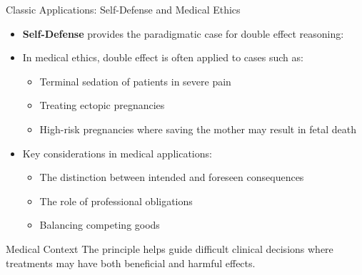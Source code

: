 \documentclass{beamer}
\begin{document}
\begin{frame}{Classic Applications: Self-Defense and Medical Ethics}
    \begin{itemize}
        \item \textbf{Self-Defense} provides the paradigmatic case for double effect reasoning:
        
        \item In medical ethics, double effect is often applied to cases such as:
        \begin{itemize}
            \item Terminal sedation of patients in severe pain
            \item Treating ectopic pregnancies
            \item High-risk pregnancies where saving the mother may result in fetal death
        \end{itemize}
        
        \item Key considerations in medical applications:
        \begin{itemize}
            \item The distinction between intended and foreseen consequences
            \item The role of professional obligations
            \item Balancing competing goods
        \end{itemize}
    \end{itemize}
    
    \begin{alertblock}{Medical Context}
        The principle helps guide difficult clinical decisions where treatments may have both beneficial and harmful effects.
    \end{alertblock}
\end{frame}
\end{document}
